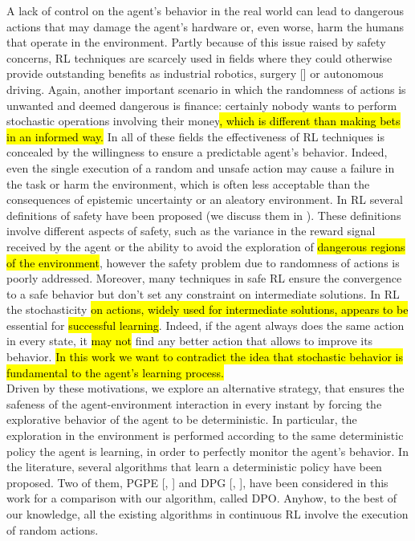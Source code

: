 A lack of control on the agent's behavior in the real world can lead to dangerous actions that may damage the agent's hardware or, even worse, harm the humans that operate in the environment. Partly because of this issue raised by safety concerns, \ac{RL} techniques are scarcely used in fields where they could otherwise provide outstanding benefits as industrial robotics, surgery [\cite{baek2018PathPlanning}] or autonomous driving. Again, another important scenario in which the randomness of actions is unwanted and deemed dangerous is finance: certainly nobody wants to perform stochastic operations involving their money\hl{, which is different than making bets in an informed way.} In all of these fields the effectiveness of \ac{RL} techniques is concealed by the willingness to ensure a predictable agent's behavior. Indeed, even the single execution of a random and unsafe action may cause a failure in the task or harm the environment, which is often less acceptable than the consequences of epistemic uncertainty or an aleatory environment. In \ac{RL} several definitions of safety have been proposed (we discuss them in ). These definitions involve different aspects of safety, such as the variance in the reward signal received by the agent or the ability to avoid the exploration of \hl{dangerous regions of the environment}, however the safety problem due to randomness of actions is poorly addressed. Moreover, many techniques in safe \ac{RL} ensure the convergence to a safe behavior but don't set any constraint on intermediate solutions. In \ac{RL} the stochasticity \hl{on actions, widely used for intermediate solutions, appears to be} essential for \hl{successful learning}. Indeed, if the agent always does the same action in every state, it \hl{may not} find any better action that allows to improve its behavior. \hl{In this work we want to contradict the idea that stochastic behavior is fundamental to the agent's learning process.}\\
\newline
Driven by these motivations, we explore an alternative strategy, that ensures the safeness of the agent-environment interaction in every instant by forcing the explorative behavior of the agent to be deterministic. In particular, the exploration in the environment is performed according to the same deterministic policy the agent is learning, in order to perfectly monitor the agent's behavior. In the literature, several algorithms that learn a deterministic policy have been proposed. Two of them, \acf{PGPE} [\citet{sehnke2008PolicyGradient}, ] and \acf{DPG} [\citet{article}, ], have been considered in this work for a comparison with our algorithm, called \acf{DPO}. Anyhow, to the best of our knowledge, all the existing algorithms in continuous \ac{RL} involve the execution of random actions.\\
